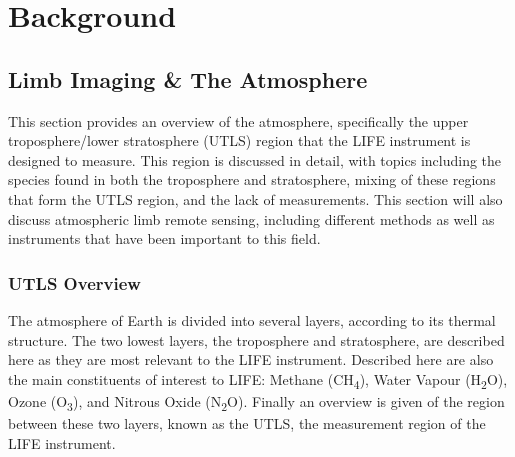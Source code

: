\chapter{Background} \label{bkgnd}

\section{Limb Imaging \& The Atmosphere}
This section provides an overview of the atmosphere, specifically the upper troposphere/lower stratosphere (UTLS) region that the LIFE instrument is designed to measure. This region is discussed in detail, with topics including the species found in both the troposphere and stratosphere, mixing of these regions that form the UTLS region, and the lack of measurements. This section will also discuss atmospheric limb remote sensing, including different methods as well as instruments that have been important to this field.

\subsection{UTLS Overview}
The atmosphere of Earth is divided into several layers, according to its thermal structure. The two lowest layers, the troposphere and stratosphere, are described here as they are most relevant to the LIFE instrument. Described here are also the main constituents of interest to LIFE: Methane (CH\textsubscript{4}), Water Vapour (H\textsubscript{2}O), Ozone (O\textsubscript{3}), and Nitrous Oxide (N\textsubscript{2}O). Finally an overview is given of the region between these two layers, known as the UTLS, the measurement region of the LIFE instrument.


